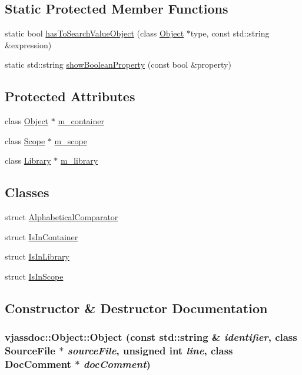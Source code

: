 \subsection*{Static Protected Member Functions}
\begin{CompactItemize}
\item 
static bool \hyperlink{classvjassdoc_1_1Object_e9ed6f9d16334a979405a9f2efab2239}{hasToSearchValueObject} (class \hyperlink{classvjassdoc_1_1Object}{Object} $\ast$type, const std::string \&expression)
\item 
static std::string \hyperlink{classvjassdoc_1_1Object_6715790d5be823157b8cf21d181b3450}{showBooleanProperty} (const bool \&property)
\end{CompactItemize}
\subsection*{Protected Attributes}
\begin{CompactItemize}
\item 
class \hyperlink{classvjassdoc_1_1Object}{Object} $\ast$ \hyperlink{classvjassdoc_1_1Object_c14bc17d0da694e343812eed35883859}{m\_\-container}
\item 
class \hyperlink{classvjassdoc_1_1Scope}{Scope} $\ast$ \hyperlink{classvjassdoc_1_1Object_e807f9d1a84a2708976d07b21a17cf81}{m\_\-scope}
\item 
class \hyperlink{classvjassdoc_1_1Library}{Library} $\ast$ \hyperlink{classvjassdoc_1_1Object_90d88574b7a542deb45e65a9242b345a}{m\_\-library}
\end{CompactItemize}
\subsection*{Classes}
\begin{CompactItemize}
\item 
struct \hyperlink{structvjassdoc_1_1Object_1_1AlphabeticalComparator}{AlphabeticalComparator}
\item 
struct \hyperlink{structvjassdoc_1_1Object_1_1IsInContainer}{IsInContainer}
\item 
struct \hyperlink{structvjassdoc_1_1Object_1_1IsInLibrary}{IsInLibrary}
\item 
struct \hyperlink{structvjassdoc_1_1Object_1_1IsInScope}{IsInScope}
\end{CompactItemize}


\subsection{Constructor \& Destructor Documentation}
\hypertarget{classvjassdoc_1_1Object_253d645fca4eb52e3d10226fab1d3673}{
\subsubsection{\setlength{\rightskip}{0pt plus 5cm}vjassdoc::Object::Object (const std::string \& {\em identifier}, class {\bf SourceFile} $\ast$ {\em sourceFile}, unsigned int {\em line}, class {\bf DocComment} $\ast$ {\em docComment})}}
\label{classvjassdoc_1_1Object_253d645fca4eb52e3d10226fab1d3673}



